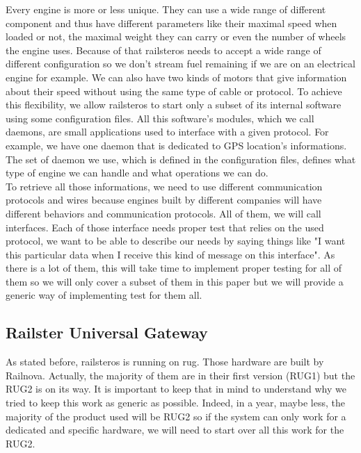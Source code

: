 \documentclass[12pt]{article}
\theoremstyle{definition}
\theoremstyle{definition}
\begin{document}
Every engine is more or less unique. They can use a wide range of different component and thus have different parameters like their maximal speed when loaded or not, the maximal weight they can carry or even the number of wheels the engine uses. Because of that \gls{railsteros} needs to accept a wide range of different configuration so we don't stream fuel remaining if we are on an electrical engine for example. We can also have two kinds of motors that give information about their speed without using the same type of cable or protocol. To achieve this flexibility, we allow \gls{railsteros} to start only a subset of its internal software using some configuration files. All this software's modules, which we call \gls{daemons}, are small applications used to interface with a given protocol. For example, we have one daemon that is dedicated to GPS location's informations. The set of daemon we use, which is defined in the configuration files, defines what type of engine we can handle and what operations we can do.\\

To retrieve all those informations, we need to use different communication protocols and wires because engines built by different companies will have different behaviors and communication protocols. All of them, we will call interfaces. Each of those interface needs proper test that relies on the used protocol, we want to be able to describe our needs by saying things like "I want this particular data when I receive this kind of message on this interface". As there is a lot of them, this will take time to implement proper testing for all of them so we will only cover a subset of them in this paper but we will provide a generic way of implementing test for them all.

\subsection{Railster Universal Gateway}

As stated before, \gls{railsteros} is running on \gls{rug}. Those hardware are built by Railnova. Actually, the majority of them are in their first version (RUG1) but the RUG2 is on its way. It is important to keep that in mind to understand why we tried to keep this work as generic as possible. Indeed, in a year, maybe less, the majority of the product used will be RUG2 so if the system can only work for a dedicated and specific hardware, we will need to start over all this work for the RUG2.\\
\end{document}
